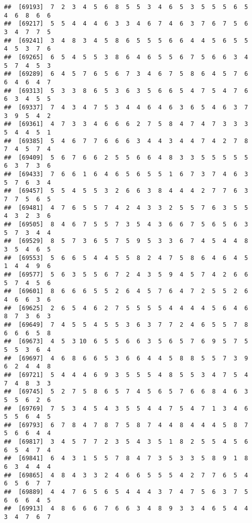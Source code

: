 \documentclass[
]{book}
\begin{document}
\begin{verbatim}
##  [69193]  7  2  3  4  5  6  8  5  5  3  4  6  5  3  5  5  5  6  5  4  6  8  6  6
##  [69217]  5  5  4  4  4  6  3  3  4  6  7  4  6  3  7  6  7  5  6  3  4  7  7  5
##  [69241]  3  4  8  3  4  5  8  6  5  5  5  6  6  4  4  5  6  5  5  4  5  3  7  6
##  [69265]  6  5  4  5  5  3  8  6  4  6  5  5  6  7  5  6  6  3  4  5  7  4  5  3
##  [69289]  6  4  5  7  6  5  6  7  3  4  6  7  5  8  6  4  5  7  6  6  4  6  4  7
##  [69313]  5  3  3  8  6  5  3  6  3  5  6  6  5  4  7  5  4  7  6  6  3  4  5  5
##  [69337]  7  4  3  4  7  5  3  4  4  6  4  6  3  6  5  4  6  3  7  3  9  5  4  2
##  [69361]  4  7  3  3  4  6  6  6  2  7  5  8  4  7  4  7  3  3  3  5  4  4  5  1
##  [69385]  5  4  6  7  7  6  6  6  3  4  4  3  4  4  7  4  2  7  8  7  4  5  7  4
##  [69409]  5  6  7  6  6  2  5  5  6  6  4  8  3  3  5  5  5  5  5  6  3  7  3  6
##  [69433]  7  6  6  1  6  4  6  5  6  5  5  1  6  7  3  7  4  6  3  5  7  6  3  4
##  [69457]  5  5  4  5  5  3  2  6  6  3  8  4  4  4  2  7  7  6  3  7  7  5  6  5
##  [69481]  4  7  6  5  5  7  4  2  4  3  3  2  5  5  7  6  3  5  5  4  3  2  3  6
##  [69505]  8  4  6  7  5  5  7  3  5  4  3  6  6  7  5  6  5  6  3  5  7  3  4  4
##  [69529]  8  5  7  3  6  5  7  5  9  5  3  3  6  7  4  5  4  4  8  3  5  4  6  5
##  [69553]  5  6  6  5  4  4  5  5  8  2  4  7  5  8  6  4  6  4  5  1  4  4  9  6
##  [69577]  5  6  3  5  5  6  7  2  4  3  5  9  4  5  7  4  2  6  6  5  7  4  5  6
##  [69601]  8  6  6  6  5  5  2  6  4  5  7  6  4  7  2  5  5  2  6  4  6  6  3  6
##  [69625]  2  6  5  4  6  2  7  5  5  5  5  4  4  4  4  5  6  4  6  8  7  3  6  3
##  [69649]  7  4  5  5  4  5  5  3  6  3  7  7  2  4  6  5  5  7  8  6  6  6  5  8
##  [69673]  4  5  3 10  6  5  5  6  6  3  5  6  5  7  6  9  5  7  5  5  5  3  6  4
##  [69697]  4  6  8  6  6  5  3  6  6  4  4  5  8  8  5  5  7  3  9  6  2  4  4  8
##  [69721]  5  4  4  4  6  9  3  5  5  5  4  8  5  5  3  4  7  5  4  7  4  8  3  3
##  [69745]  5  2  7  5  8  6  5  7  4  5  6  5  7  6  6  8  4  6  3  5  5  6  2  6
##  [69769]  7  5  3  4  5  4  3  5  5  4  4  7  5  4  7  1  3  4  6  5  5  6  4  5
##  [69793]  6  7  8  4  7  8  7  5  8  7  4  4  8  4  4  4  5  8  7  5  6  6  4  4
##  [69817]  3  4  5  7  7  2  3  5  4  3  5  1  8  2  5  5  4  5  6  6  5  4  7  4
##  [69841]  6  4  3  1  5  5  7  8  4  7  3  5  3  3  5  8  9  1  8  6  3  4  4  4
##  [69865]  4  8  4  3  3  2  4  6  6  5  5  5  4  2  7  7  6  5  4  6  5  6  7  7
##  [69889]  4  4  7  6  5  6  5  4  4  4  3  7  4  7  5  6  3  7  5  6  6  6  4  5
##  [69913]  4  8  6  6  6  7  6  6  3  4  8  9  3  3  4  6  5  4  4  3  4  7  6  7

\end{verbatim}
\end{document}
